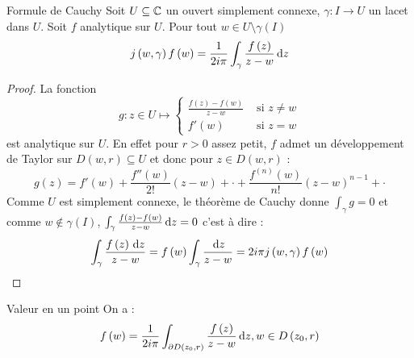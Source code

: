 \documentclass{cours}
\begin{document}
\begin{théorème}{Formule de Cauchy}{}
    Soit $U \subseteq \mathbb{C}$ un ouvert simplement connexe, $\gamma : I \to U$ un lacet dans $U$. Soit $f$ analytique sur $U$. Pour tout $w \in U \setminus \gamma\left(I\right)$
    \begin{equation*}
        j\left(w, \gamma\right)f\left(w\right) = \frac{1}{2i\pi}\int_{\gamma}\frac{f\left(z\right)}{z - w}{\rm \, d} z
    \end{equation*}
\end{théorème}
\begin{proof}
    La fonction
    \begin{equation*}
        g : z \in U \mapsto \begin{cases}
            \frac{f\left(z\right)-f\left(w\right)}{z-w} & \text{ si } z \neq w\\
            f'\left(w\right) & \text{ si } z = w
        \end{cases}
    \end{equation*}
    est analytique sur $U$. En effet pour $r > 0$ assez petit, $f$ admet un développement de Taylor sur $D\left(w, r\right) \subseteq U$ et donc pour $z \in D\left(w, r\right)$ :
    \begin{equation*}
        g\left(z\right) = f'\left(w\right) + \frac{f''\left(w\right)}{2!}\left(z - w\right) + \cdot + \frac{f^{\left(n\right)}\left(w\right)}{n!}\left(z - w\right)^{n - 1} + \cdot
    \end{equation*}
    Comme $U$ est simplement connexe, le théorème de Cauchy donne $\int_{\gamma} g = 0$ et comme $w \notin \gamma\left(I\right)$, $\int_{\gamma}\frac{f\left(z\right) - f\left(w\right)}{z - w}{\rm \, d} z = 0$ c'est à dire : 
    \begin{equation*}
        \int_{\gamma}\frac{f\left(z\right){\rm \, d} z}{z - w} = f\left(w\right)\int_{\gamma}\frac{{\rm \, d} z}{z - w} = 2i\pi j\left(w, \gamma\right)f\left(w\right)
    \end{equation*}
\end{proof}

\begin{corollaire}{Valeur en un point}{}
    On a : 
    \begin{equation*}
        f\left(w\right) = \frac{1}{2i\pi}\int_{\partial D\left(z_{0}, r\right)}\frac{f\left(z\right)}{z-w}{\rm \, d} z, w \in D\left(z_{0}, r\right)
    \end{equation*}
\end{corollaire}
\end{document}
